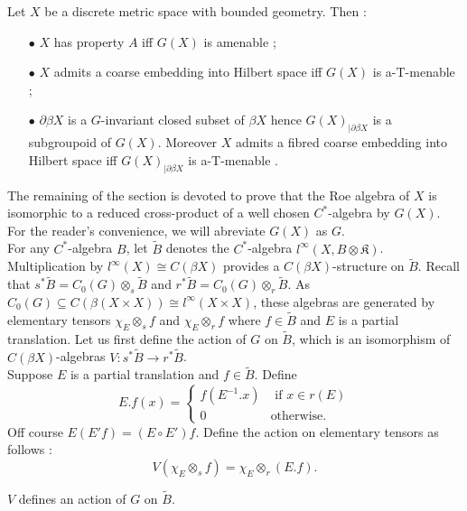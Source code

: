 \begin{thm}
Let $X$ be a discrete metric space with bounded geometry. Then :
\begin{itemize}
\item[$\bullet$] $X$ has property $A$ iff $G(X)$ is amenable \cite{SkTuYu};
\item[$\bullet$] $X$ admits a coarse embedding into Hilbert space iff $G(X)$ is a-T-menable \cite{SkTuYu};
\item[$\bullet$] $\partial \beta X$ is a $G$-invariant closed subset of $\beta X$ hence $G(X)_{|\partial\beta X}$ is a subgroupoid of $G(X)$. Moreover $X$ admits a fibred coarse embedding into Hilbert space iff $G(X)_{|\partial\beta X}$ is a-T-menable \cite{FinnSellFibred}.
\end{itemize}
\end{thm}

The remaining of the section is devoted to prove that the Roe algebra of $X$ is isomorphic to a reduced cross-product of a well chosen $C^*$-algebra by $G(X)$. For the reader's convenience, we will abreviate $G(X)$ as $G$.\\

For any $C^*$-algebra $B$, let $\tilde B$ denotes the $C^*$-algebra $l^\infty(X,B\otimes\mathfrak K)$. Multiplication by $l^\infty(X)\cong C(\beta X)$ provides a $C(\beta X)$-structure on $\tilde B$. Recall that $s^* \tilde B = C_0(G)\otimes_s \tilde B$ and $r^* \tilde B = C_0(G)\otimes_r \tilde B$. As $C_0(G)\subseteq C(\beta(X\times X))\cong l^\infty(X\times X)$, these algebras are generated by elementary tensors $\chi_E\otimes_s f$ and $\chi_E\otimes_r f$ where $f\in\tilde B$ and $E$ is a partial translation. Let us first define the action of $G$ on $\tilde B$, which is an isomorphism of $C(\beta X)$-algebras $V :s^* \tilde B\rightarrow r^* \tilde B$.\\

Suppose $E$ is a partial translation and $f\in\tilde B$. Define 
\[E.f(x) = \left\{\begin{array}{ll} f(E^{-1}.x) & \text{ if }x\in r(E)\\ 0 & \text{otherwise.}\end{array}\right.\]
Off course $E(E'f)=(E\circ E')f$. Define the action on elementary tensors as follows :
\[V(\chi_E \otimes_s f) = \chi_E \otimes_r (E.f).\]

\begin{lem}
$V$ defines an action of $G$ on $\tilde B$.
\end{lem}


